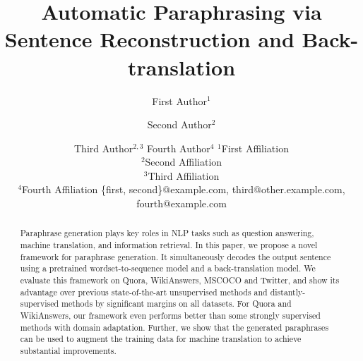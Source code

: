 \documentclass{article}
\title{Automatic Paraphrasing via Sentence Reconstruction and
Back-translation}
\author{
First Author$^1$
\and
Second Author$^2$\and
Third Author$^{2,3}$\And
Fourth Author$^4$
\affiliations
$^1$First Affiliation\\
$^2$Second Affiliation\\
$^3$Third Affiliation\\
$^4$Fourth Affiliation
\emails
\{first, second\}@example.com,
third@other.example.com,
fourth@example.com
}
\begin{document}
\maketitle

\begin{abstract}
Paraphrase generation plays key roles in NLP tasks such as question answering, machine translation, and information retrieval. In this paper, we propose a novel framework for paraphrase generation. It simultaneously decodes the output sentence using a pretrained wordset-to-sequence model and a back-translation model. We evaluate this framework on Quora, WikiAnswers, MSCOCO and Twitter, and show its advantage over previous state-of-the-art unsupervised methods and distantly-supervised methods by significant margins on all datasets. For Quora and WikiAnswers, our framework even performs better than some strongly supervised methods with domain adaptation. Further, we show that the generated paraphrases can be used to augment the training data for machine translation to achieve substantial improvements.
\end{abstract}










\end{document}
